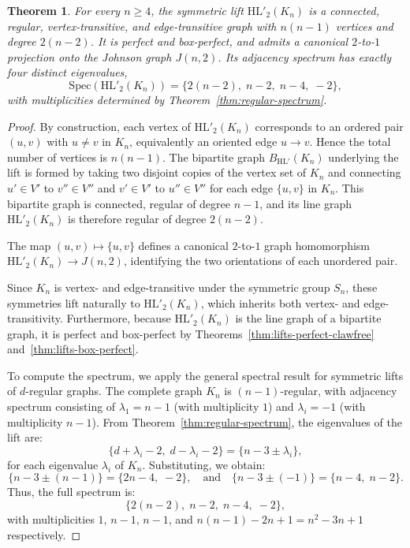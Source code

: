 \documentclass[11pt]{article}
\newtheorem{theorem}{Theorem}
\newcommand{\HL}{\mathrm{HL}}
\theoremstyle{plain}
\begin{document}
\begin{theorem}\label{thm:Kn-lift}
For every $n \ge 4$, the symmetric lift $\mathrm{HL}'_2(K_n)$ is a connected, regular, vertex-transitive,
and edge-transitive graph with $n(n-1)$ vertices and degree $2(n-2)$. It is perfect and box-perfect,
and admits a canonical $2$-to-$1$ projection onto the Johnson graph $J(n,2)$. Its adjacency spectrum
has exactly four distinct eigenvalues,
\[
\mathrm{Spec}(\mathrm{HL}'_2(K_n)) = \{ 2(n-2),\; n-2,\; n-4,\; -2 \},
\]
with multiplicities determined by Theorem~\ref{thm:regular-spectrum}.
\end{theorem}

\begin{proof}
By construction, each vertex of $\mathrm{HL}'_2(K_n)$ corresponds to an ordered pair $(u,v)$ with $u \ne v$ in $K_n$, equivalently an oriented edge $u\to v$. Hence the total number of vertices is $n(n-1)$. The bipartite graph $B_{\mathrm{HL}'}(K_n)$ underlying the lift is formed by taking two disjoint copies of the vertex set of $K_n$ and connecting $u' \in V'$ to $v'' \in V''$ and $v' \in V'$ to $u'' \in V''$ for each edge $\{u,v\}$ in $K_n$. This bipartite graph is connected, regular of degree $n-1$, and its line graph $\mathrm{HL}'_2(K_n)$ is therefore regular of degree $2(n-2)$.

The map $(u,v)\mapsto \{u,v\}$ defines a canonical $2$-to-$1$ graph homomorphism
$\HL'_2(K_n)\to J(n,2)$, identifying the two orientations of each unordered pair.

Since $K_n$ is vertex- and edge-transitive under the symmetric group $S_n$, these symmetries lift naturally to
$\mathrm{HL}'_2(K_n)$, which inherits both vertex- and edge-transitivity. Furthermore, because
$\mathrm{HL}'_2(K_n)$ is the line graph of a bipartite graph, it is perfect and box-perfect by
Theorems~\ref{thm:lifts-perfect-clawfree} and~\ref{thm:lifts-box-perfect}.

To compute the spectrum, we apply the general spectral result for symmetric lifts of $d$-regular graphs. The complete graph $K_n$ is $(n-1)$-regular, with adjacency spectrum consisting of $\lambda_1 = n-1$ (with multiplicity $1$) and $\lambda_i = -1$ (with multiplicity $n-1$). From Theorem~\ref{thm:regular-spectrum}, the eigenvalues of the lift are:
\[
\{ d + \lambda_i - 2,\; d - \lambda_i - 2 \} = \{ n - 3 \pm \lambda_i \},
\]
for each eigenvalue $\lambda_i$ of $K_n$. Substituting, we obtain:
\[
\{ n - 3 \pm (n - 1) \} = \{ 2n - 4,\; -2 \}, \quad \text{and} \quad \{ n - 3 \pm (-1) \} = \{ n - 4,\; n - 2 \}.
\]
Thus, the full spectrum is:
\[
\{ 2(n-2),\; n - 2,\; n - 4,\; -2 \},
\]
with multiplicities $1$, $n-1$, $n-1$, and $n(n-1)-2n+1 = n^2-3n+1$ respectively.


\end{proof}
\end{document}
